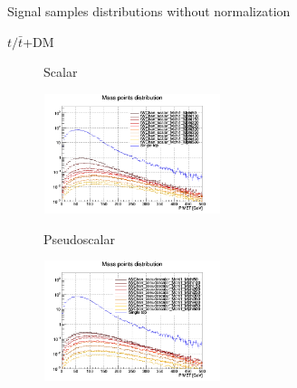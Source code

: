 \documentclass[8pt]{beamer}
\begin{document}
\begin{frame}{Signal samples distributions without normalization}
\justifying
\begin{block}{\centering $t/\bar t$+DM}\end{block} \vspace{-10pt}
\begin{figure}[htbp]
\centering
\begin{minipage}[b]{.49\textwidth}
\vspace{-5pt}
\begin{block}{\centering Scalar}\end{block}
\begin{center}
\includegraphics[width=5.2cm, height=3.5cm]{figs/singleTopScalarMET.png}
\end{center}
\end{minipage}
\begin{minipage}[b]{.02\textwidth}\end{minipage}
\begin{minipage}[b]{.49\textwidth}
\vspace{-5pt}
\begin{block}{\centering Pseudoscalar}\end{block}
\begin{center}
\includegraphics[width=5.2cm, height=3.5cm]{figs/singleTopPseudoMET.png}
\end{center}
\end{minipage}
\end{figure} \vfill


\end{frame}
\end{document}
